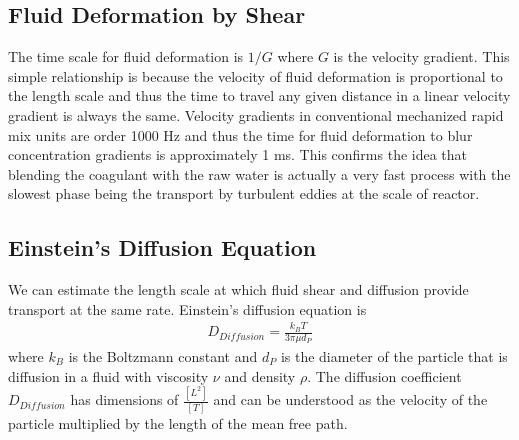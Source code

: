 \documentclass[letterpaper,10pt,english]{sphinxmanual}
\begin{document}
\subsection{Fluid Deformation by Shear}
\label{\detokenize{Rapid_Mix/RM_Theory_and_Future_Work:fluid-deformation-by-shear}}\label{\detokenize{Rapid_Mix/RM_Theory_and_Future_Work:heading-fluid-deformation-by-shear}}
The time scale for fluid deformation is \(1/G\) where \(G\) is the velocity gradient. This simple relationship is because the velocity of fluid deformation is proportional to the length scale and thus the time to travel any given distance in a linear velocity gradient is always the same. Velocity gradients in conventional mechanized rapid mix units are order 1000 Hz and thus the time for fluid deformation to blur concentration gradients is approximately 1 ms. This confirms the idea that blending the coagulant with the raw water is actually a very fast process with the slowest phase being the transport by turbulent eddies at the scale of reactor.


\subsection{Einstein’s Diffusion Equation}
\label{\detokenize{Rapid_Mix/RM_Theory_and_Future_Work:einsteins-diffusion-equation}}\label{\detokenize{Rapid_Mix/RM_Theory_and_Future_Work:heading-einstein-diffusion-equation}}
We can estimate the length scale at which fluid shear and diffusion provide transport at the same rate. Einstein’s diffusion equation is
\begin{equation}\label{equation:Rapid_Mix/RM_Theory_and_Future_Work:Rapid_Mix/RM_Theory_and_Future_Work:21}
\begin{split}D_{Diffusion} = \frac{k_B T}{3 \pi \mu d_P}\end{split}
\end{equation}
where \(k_B\) is the Boltzmann constant and \(d_P\) is the diameter of the particle that is diffusion in a fluid with viscosity \(\nu\) and density \(\rho\). The diffusion coefficient \(D_{Diffusion}\) has dimensions of \(\frac{[L^2]}{[T]}\) and can be understood as the velocity of the particle multiplied by the length of the mean free path.
\end{document}
